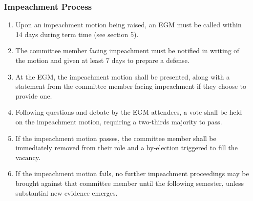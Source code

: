 \subsubsection{Impeachment Process}
\begin{enumerate}
\item Upon an impeachment motion being raised, an EGM must be called within 14 days during term time (see section 5).
\item The committee member facing impeachment must be notified in writing of the motion and given at least 7 days to prepare a defense.
\item At the EGM, the impeachment motion shall be presented, along with a statement from the committee member facing impeachment if they choose to provide one.
\item Following questions and debate by the EGM attendees, a vote shall be held on the impeachment motion, requiring a two-thirds majority to pass.
\item If the impeachment motion passes, the committee member shall be immediately removed from their role and a by-election triggered to fill the vacancy.
\item If the impeachment motion fails, no further impeachment proceedings may be brought against that committee member until the following semester, unless substantial new evidence emerges.
\end{enumerate}